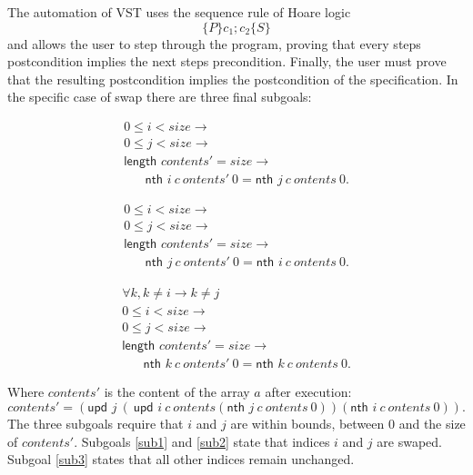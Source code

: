 \documentclass[onecolumn, preprint]{sigplanconf}
\newcommand{\nth}[3]{\textsf{nth } #1\ #2\ #3}
\newcommand{\unth}[3]{\textsf{upd } #1\ #2\ #3}
\begin{document}
The automation of VST uses the sequence rule of Hoare logic
$$\{P\} c_1;c_2 \{S\}$$
and allows the user to step through the program, proving that every steps postcondition implies the next steps precondition. Finally, the user must prove that the resulting postcondition implies the postcondition of the specification. In the specific case of swap there are three final subgoals:


\begin{equation}
\label{sub1}
\begin{aligned}
&0 \leq i < size \rightarrow &\\
&0 \leq j < size \rightarrow &\\
&\textsf{length } contents' = size \rightarrow &\\
& \hspace{20pt} \nth i contents' \  0 = \nth j contents \ 0.
\end{aligned}
\end{equation}

\begin{equation}
\label{sub2}
\begin{aligned}
&0 \leq i < size \rightarrow &\\
&0 \leq j < size \rightarrow &\\
&\textsf{length } contents' = size \rightarrow &\\
& \hspace{20pt} \nth j contents' \  0 = \nth i contents \ 0.
\end{aligned}
\end{equation}

\begin{equation}
\label{sub3}
\begin{aligned}
&\forall k, k\not = i \rightarrow k\not =j & \\
&0 \leq i < size \rightarrow &\\
&0 \leq j < size \rightarrow &\\
&\textsf{length } contents' = size \rightarrow &\\
& \hspace{20pt} \nth k contents' \  0 = \nth k contents \ 0.
\end{aligned}
\end{equation}

Where $contents'$ is the content of the array $a$ after execution:
$$contents' = (\unth j (\unth i contents (\nth j contents \  0)) (\nth i contents \  0)).$$
The three subgoals require that $i$ and $j$ are within bounds, between 0 and the size of $contents'$. Subgoals \ref{sub1} and \ref{sub2} state that indices $i$ and $j$ are swaped.
Subgoal \ref{sub3} states that all other indices remain unchanged.
\end{document}
